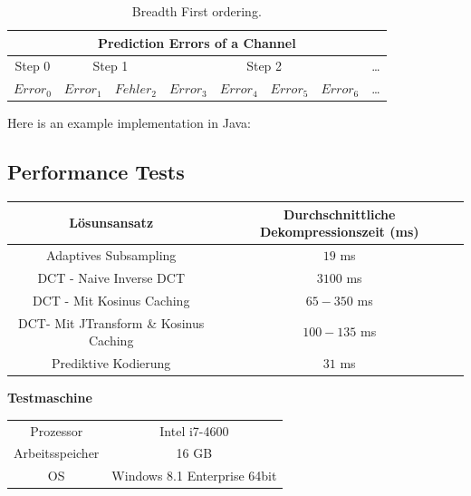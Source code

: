\begin{table}[!htbp]
	\center
	\begin{tabular}{|c||c|c||c|c|c|c||c}
		\hline
		\multicolumn{8}{|c|}{Prediction Errors of a Channel}\\\hline\hline
		 Step 0& \multicolumn{2}{|c||}{Step 1} & \multicolumn{4}{|c||}{Step 2} &\ldots \\\hline
		$Error_0$ & $Error_1$ &$Fehler_2$ &$Error_3$ & $Error_4$ & $Error_5$ & $Error_6$   & \ldots \\\hline
	\end{tabular}
	\caption{Breadth First ordering.}
	\label{anhang:prediction:breath}
\end{table}
\pagebreak
Here is an example implementation in Java:

\pagebreak

\subsection{Performance Tests} \label{anhang:performance}
\begin{table}[!htbp]
\center
\begin{tabular}{c|c}
	Lösunsansatz & Durchschnittliche Dekompressionszeit (ms) \\\hline
	Adaptives Subsampling & $19$ ms \\
	DCT - Naive Inverse DCT & $3100$ ms \\
	DCT - Mit Kosinus Caching & $65-350$ ms\\
	DCT- Mit JTransform \& Kosinus Caching & $100-135$ ms\\
	Prediktive Kodierung & $31$ ms\\
\end{tabular}
\end{table}

\textbf{Testmaschine}
\begin{table}[!htbp]
\begin{tabular}{c|c}
	Prozessor & Intel i7-4600 \\
	Arbeitsspeicher & 16 GB \\
	OS & Windows 8.1 Enterprise 64bit \\
\end{tabular}
\end{table}
